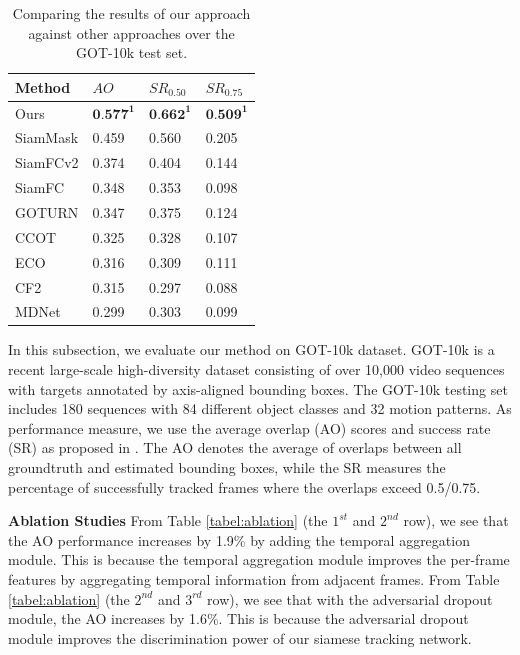 \documentclass{article}
\begin{document}
\begin{table}
\centering
\caption{Comparing the results of our approach against other approaches over the GOT-10k test set.}
\begin{tabular}{l l l l}
\bottomrule
Method   &  $AO$   &  $SR_{0.50}$ & $SR_{0.75}$  \\
\hline
Ours &  $\textbf{0.577}^\textbf{1}$ & $\textbf{0.662}^\textbf{1}$  & $\textbf{0.509}^\textbf{1}$  \\
SiamMask &  0.459&  0.560 &0.205 \\
SiamFCv2 &  0.374&  0.404 &0.144 \\
SiamFC   &  0.348&  0.353 &0.098 \\
GOTURN	 &  0.347&  0.375 &0.124 \\
CCOT	 &  0.325&  0.328 &0.107 \\
ECO	     &  0.316&  0.309 &0.111 \\
CF2	     &  0.315&  0.297 &0.088 \\
MDNet	 &  0.299&  0.303 &0.099 \\
\bottomrule
\end{tabular}
\label{table:got}
\end{table}
In this subsection, we evaluate our method on GOT-10k \cite{Huang_2019} dataset.
GOT-10k is a recent large-scale high-diversity dataset consisting of over 10,000 video sequences with targets annotated by axis-aligned bounding boxes. 
The GOT-10k testing set includes 180 sequences with 84 different object classes and 32 motion patterns. As performance measure, we use the average overlap (AO) scores and success rate (SR) as proposed in \cite{Huang_2019}. The AO denotes the average of overlaps between all groundtruth and estimated bounding boxes, while the SR measures the percentage of successfully tracked frames where the overlaps exceed 0.5/0.75.

\textbf{Ablation Studies}
From Table \ref{tabel:ablation} (the $1^{st}$ and $2^{nd}$ row), we see that the AO performance increases by 1.9\% by adding the temporal aggregation module.
This is because the temporal aggregation module improves the per-frame features by aggregating temporal information from adjacent frames.
From Table \ref{tabel:ablation} (the $2^{nd}$ and $3^{rd}$ row), we see that with the adversarial dropout module, the AO increases by 1.6\%.
This is because the adversarial dropout module improves the discrimination power of our siamese tracking network.
\end{document}
